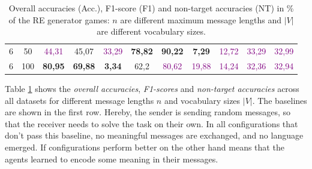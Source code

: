 \begin{table}[ht]
\begin{tabular}{cc|ccc|ccc|ccc}
        {6}                           & {50}   & \textcolor{purple}{44,31}           & {45,07}                             & \textcolor{purple}{33,29}                & {\textbf{78,82}}          & {\textbf{90,22}}          & {\textbf{7,29}}           & \textcolor{purple}{12,72} & \textcolor{purple}{33,29} & \textcolor{purple}{32,99} \\
        {6}                           & {100}  & {\textbf{80,95}}                    & {\textbf{69,88}}                    & {\textbf{3,34}}                          & {62,2}                    & \textcolor{purple}{80,62} & \textcolor{purple}{19,88} & \textcolor{purple}{14,24} & \textcolor{purple}{32,36} & \textcolor{purple}{32,94} \\
        \bottomrule
    \end{tabular}
    \caption{Overall accuracies (Acc.), F1-score (F1) and non-target accuracies (NT) in \% of the RE generator games: $n$ are different maximum message lengths and $|V|$ are different vocabulary sizes.}
    \label{tab:results:re-generator-game}
\end{table}

Table \ref{tab:results:re-generator-game} shows the \emph{overall accuracies}, \emph{F1-scores} and \emph{non-target accuracies} across all datasets for different message lengths $n$ and vocabulary sizes $|V|$.
The baselines are shown in the first row.
Hereby, the sender is sending random messages, so that the receiver needs to solve the task on their own.
In all configurations that don't pass this baseline, no meaningful messages are exchanged, and no language emerged.
If configurations perform better on the other hand means that the agents learned to encode some meaning in their messages.

